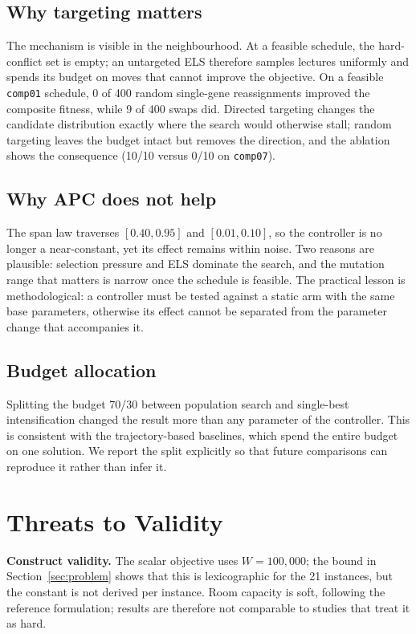 \documentclass[journal]{IEEEtran}
\newcommand{\code}[1]{\texttt{#1}}
\begin{document}
\subsection{Why targeting matters}
The mechanism is visible in the neighbourhood. At a feasible schedule, the hard-conflict set is empty; an untargeted ELS therefore samples lectures uniformly and spends its budget on moves that cannot improve the objective. On a feasible \code{comp01} schedule, 0 of 400 random single-gene reassignments improved the composite fitness, while 9 of 400 swaps did. Directed targeting changes the candidate distribution exactly where the search would otherwise stall; random targeting leaves the budget intact but removes the direction, and the ablation shows the consequence (10/10 versus 0/10 on \code{comp07}).

\subsection{Why APC does not help}
The span law traverses $[0.40,0.95]$ and $[0.01,0.10]$, so the controller is no longer a near-constant, yet its effect remains within noise. Two reasons are plausible: selection pressure and ELS dominate the search, and the mutation range that matters is narrow once the schedule is feasible. The practical lesson is methodological: a controller must be tested against a static arm with the same base parameters, otherwise its effect cannot be separated from the parameter change that accompanies it.

\subsection{Budget allocation}
Splitting the budget 70/30 between population search and single-best intensification changed the result more than any parameter of the controller. This is consistent with the trajectory-based baselines, which spend the entire budget on one solution. We report the split explicitly so that future comparisons can reproduce it rather than infer it.

\section{Threats to Validity}
\textbf{Construct validity.} The scalar objective uses $W=100{,}000$; the bound in Section~\ref{sec:problem} shows that this is lexicographic for the 21 instances, but the constant is not derived per instance. Room capacity is soft, following the reference formulation; results are therefore not comparable to studies that treat it as hard.
\end{document}
